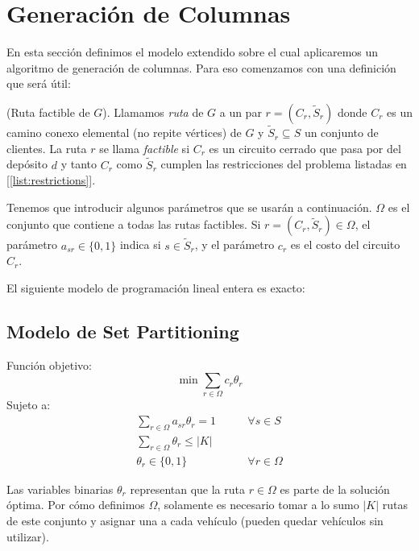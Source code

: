 \section{Generación de Columnas}

En esta sección definimos el modelo extendido sobre el cual aplicaremos un algoritmo de generación de columnas. Para eso comenzamos con una definición que será útil:

\begin{definition}
    (Ruta factible de $G$).
    Llamamos \emph{ruta} de $G$ a un par $r = (C_r, \tilde{S}_r)$ donde $C_r$ es un camino conexo elemental (no repite vértices) de $G$ y $\tilde{S}_r \subseteq S$ un conjunto de clientes. La ruta $r$ se llama \emph{factible} si $C_r$ es un circuito cerrado que pasa por del depósito $d$ y tanto $C_r$ como $\tilde{S}_r$ cumplen las restricciones del problema listadas en [\ref{list:restrictions}].
\end{definition}

Tenemos que introducir algunos parámetros que se usarán a continuación. $\Omega$ es el conjunto que contiene a todas las rutas factibles. Si $r = (C_r, \tilde{S}_r) \in \Omega$, el parámetro $a_{sr} \in \{0, 1\}$ indica si $s \in \tilde{S}_r$, y el parámetro $c_r$ es el costo del circuito $C_r$. 

El siguiente modelo de programación lineal entera es exacto:

\subsection{Modelo de Set Partitioning}
\label{section:set-partitioning}

Función objetivo:
\begin{equation}
    \min \sum_{r \in \Omega} c_r  \theta_r
\end{equation}
Sujeto a:
\begin{align}
    \sum_{r \in \Omega} {a_{sr}\theta_r} = 1
\qquad & \forall {s \in S} \label{eq:master1} \\
\sum_{r \in \Omega}{\theta_r} \leq |K| & \label{eq:master2} \\
\theta_r \in \{0, 1\} \qquad & \forall{r \in \Omega}
\end{align}

Las variables binarias $\theta_r$ representan que la ruta $r \in \Omega$ es parte de la solución óptima. Por cómo definimos $\Omega$, solamente es necesario tomar a lo sumo $|K|$ rutas de este conjunto y asignar una a cada vehículo (pueden quedar vehículos sin utilizar). 

